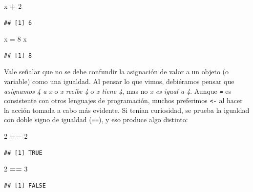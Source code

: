 \documentclass[
]{article}
\newenvironment{Shaded}{\begin{snugshade}}{\end{snugshade}}
\newcommand{\DecValTok}[1]{\textcolor[rgb]{0.00,0.00,0.81}{#1}}
\newcommand{\NormalTok}[1]{#1}
\newcommand{\OtherTok}[1]{\textcolor[rgb]{0.56,0.35,0.01}{#1}}
\newcommand{\SpecialCharTok}[1]{\textcolor[rgb]{0.81,0.36,0.00}{\textbf{#1}}}
\begin{document}
\begin{Shaded}
\begin{Highlighting}[]
\NormalTok{x }\SpecialCharTok{+} \DecValTok{2}
\end{Highlighting}
\end{Shaded}

\begin{verbatim}
## [1] 6
\end{verbatim}

\begin{Shaded}
\begin{Highlighting}[]
\NormalTok{x }\OtherTok{=} \DecValTok{8}
\NormalTok{x}
\end{Highlighting}
\end{Shaded}

\begin{verbatim}
## [1] 8
\end{verbatim}

Vale señalar que no se debe confundir la asignación de valor a un objeto
(o variable) como una igualdad. Al pensar lo que vimos, debiéramos
pensar que \emph{asignamos 4 a x} o \emph{x recibe 4} o \emph{x tiene
4}, mas no \emph{x es igual a 4}. Aunque \texttt{=} es consistente con
otros lenguajes de programación, muchos preferimos \texttt{\textless{}-}
al hacer la acción tomada a cabo más evidente. Si tenían curiosidad, se
prueba la igualdad con doble signo de igualdad (\texttt{==}), y eso
produce algo distinto:

\begin{Shaded}
\begin{Highlighting}[]
\DecValTok{2} \SpecialCharTok{==} \DecValTok{2}
\end{Highlighting}
\end{Shaded}

\begin{verbatim}
## [1] TRUE
\end{verbatim}

\begin{Shaded}
\begin{Highlighting}[]
\DecValTok{2} \SpecialCharTok{==} \DecValTok{3}
\end{Highlighting}
\end{Shaded}

\begin{verbatim}
## [1] FALSE
\end{verbatim}
\end{document}

